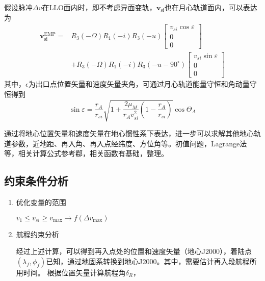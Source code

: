 假设脉冲$ \Delta v $在LLO面内时，即不考虑异面变轨，$ \bm{v}_\mathrm{si}  $也在月心轨道面内，可以表达为
\begin{equation}
	\begin{aligned}
		\boldsymbol{v}_{\mathrm{si}}^{\mathrm{EMP}}= & R_{3}(-\Omega) R_{1}(-i) R_{3}(-u)  \left[\begin{array}{c}
				v_{s i} \cos \varepsilon \\
				0                        \\
				0
			\end{array}\right]                      \\
		{}                            & +R_{3}(-\Omega) R_{1}(-i) R_{3}\left(-u-90^{\circ}\right)\left[\begin{array}{c}
				v_{s i} \sin \varepsilon \\
				0                        \\
				0
			\end{array}\right]
	\end{aligned}
\end{equation}
其中，$ \epsilon $为出口点位置矢量和速度矢量夹角，可通过月心轨道能量守恒和角动量守恒得到
\begin{equation}\sin \varepsilon=\frac{r_{A}}{r_{s i}} \sqrt{1+\frac{2 \mu_{M}}{r_{A} v_{s i}^{2}}\left(1-\frac{r_{A}}{r_{s i}}\right)} \cos \Theta_{A}\end{equation}

通过将地心位置矢量和速度矢量在地心惯性系下表达，进一步可以求解其他地心轨道参数，近地距、再入角、再入点经纬度、方位角等。初值问题，Lagrange法等，相关计算公式参考郗，相关函数有基础，整理。

\subsection{约束条件分析}
\begin{enumerate}
	\item 优化变量的范围
	
	$ v_1 \leq v_{si} \geq v_{\max} \to f(\Delta v_{\max})$
	\item 航程约束分析

		经过上述计算，可以得到再入点处的位置和速度矢量（地心J2000），着陆点$ (\lambda_f,\phi_f) $已知，通过地固系转换到地心J2000。其中，需要估计再入段航程所用时间。
		根据位置矢量计算航程角$ \delta_R $，
\end{enumerate}

